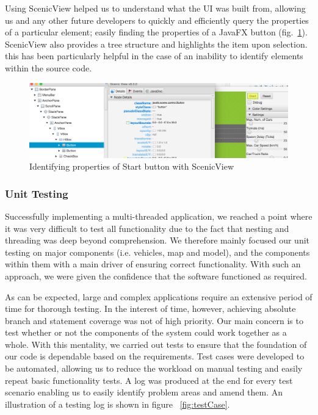 Using ScenicView helped us to understand what the UI was built from, allowing us and any other future developers to quickly and efficiently query the properties of a particular element; easily finding the properties of a JavaFX button (fig.~\ref{fig:scenicview}). ScenicView also provides a tree structure and highlights the item upon selection. this has been particularly helpful in the case of an inability to identify elements within the source code.  
\begin{figure}[h]
	\begin{center}
		\includegraphics[width=\textwidth]{img/scenicView.png}
		\caption[Identifying properties of Start button with ScenicView]{Identifying properties of Start button with ScenicView}
	\label{fig:scenicview}
	\end{center}
\end{figure}

\subsubsection*{Unit Testing}
Successfully implementing a multi-threaded application, we reached a point where it was very difficult to test all functionality due to the fact that nesting and threading was deep beyond comprehension. We therefore mainly focused our unit testing on major components (i.e. vehicles, map and model), and the components within them with a main driver of ensuring correct functionality. With such an approach, we were given the confidence that the software functioned as required.

As can be expected, large and complex applications require an extensive period of time for thorough testing. In the interest of time, however, achieving absolute branch and statement coverage was not of high priority. Our main concern is to test whether or not the components of the system could work together as a whole.  With this mentality, we carried out tests to ensure that the foundation of our code is dependable based on the requirements. Test cases were developed to be automated, allowing us to reduce the workload on manual testing and easily repeat basic functionality tests. A log was produced at the end for every test scenario enabling us to easily identify problem areas and amend them. An illustration of a testing log is shown in figure ~\ref{fig:testCase}. 


